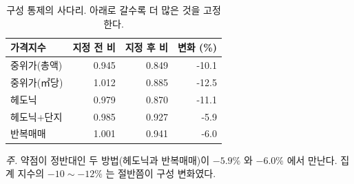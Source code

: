 \begin{table}[htbp]
  \centering
  \caption{구성 통제의 사다리. 아래로 갈수록 더 많은 것을 고정한다.}
  \label{tab:index-ladder}
  \begin{tabular}{lrrr}
    \toprule
    \textbf{가격지수} & \textbf{지정 전 비} & \textbf{지정 후 비} & \textbf{변화 (\%)} \\
    \midrule
    중위가(총액) & 0.945 & 0.849 & -10.1 \\
    중위가(㎡당) & 1.012 & 0.885 & -12.5 \\
    헤도닉 & 0.979 & 0.870 & -11.1 \\
    헤도닉+단지 & 0.985 & 0.927 & -5.9 \\
    반복매매 & 1.001 & 0.941 & -6.0 \\
    \bottomrule
  \end{tabular}

  \begin{minipage}{\linewidth}\footnotesize
  \textit{주.} 약점이 정반대인 두 방법(헤도닉과 반복매매)이 $-5.9\%$ 와 $-6.0\%$ 에서 만난다. 집계 지수의 $-10 \sim -12\%$ 는 절반쯤이 구성 변화였다.
  \end{minipage}
\end{table}
